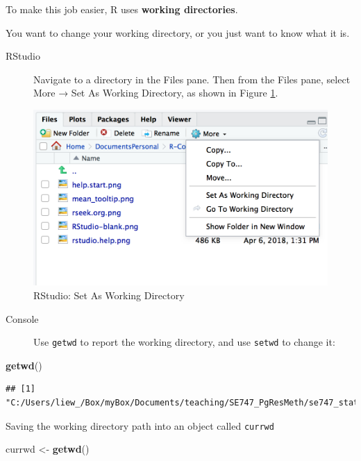 \documentclass[
]{book}
\newenvironment{Shaded}{\begin{snugshade}}{\end{snugshade}}
\newcommand{\KeywordTok}[1]{\textcolor[rgb]{0.13,0.29,0.53}{\textbf{#1}}}
\newcommand{\NormalTok}[1]{#1}
\newcommand{\StringTok}[1]{\textcolor[rgb]{0.31,0.60,0.02}{#1}}
\begin{document}
To make this job easier, R uses \textbf{working directories}.

You want to change your working directory, or you just want to know what
it is.

\begin{description}
\item[RStudio]
Navigate to a directory in the Files pane. Then from the Files pane, select More → Set As Working Directory, as shown in Figure \ref{fig:workingdir}.
\end{description}

\begin{figure}
\includegraphics[width=13.53in]{images/rstudio.files} \caption{RStudio: Set As Working Directory}\label{fig:workingdir}
\end{figure}

\begin{description}
\item[Console]
Use \texttt{getwd} to report the working directory, and use \texttt{setwd} to
change it:
\end{description}

\begin{Shaded}
\begin{Highlighting}[]
\KeywordTok{getwd}\NormalTok{()}
\end{Highlighting}
\end{Shaded}

\begin{verbatim}
## [1] "C:/Users/liew_/Box/myBox/Documents/teaching/SE747_PgResMeth/se747_stats_book"
\end{verbatim}

Saving the working directory path into an object called \texttt{currwd}

\begin{Shaded}
\begin{Highlighting}[]
\NormalTok{currwd <-}\StringTok{ }\KeywordTok{getwd}\NormalTok{()}
\end{Highlighting}
\end{Shaded}
\end{document}
